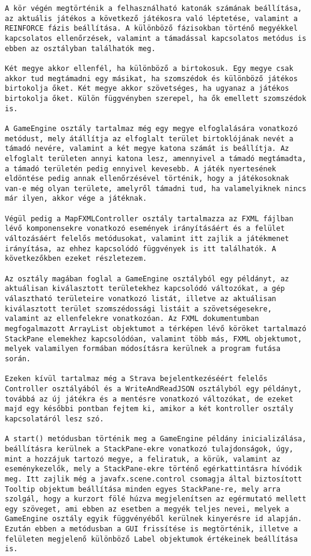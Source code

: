 \begin{verbatim}
A kör végén megtörténik a felhasználható katonák számának beállítása, az aktuális játékos a következő játékosra való léptetése, valamint a REINFORCE fázis beállítása. A különböző fázisokban történő megyékkel kapcsolatos ellenőrzések, valamint a támadással kapcsolatos metódus is ebben az osztályban találhatók meg. 

Két megye akkor ellenfél, ha különböző a birtokosuk. Egy megye csak akkor tud megtámadni egy másikat, ha szomszédok és különböző játékos birtokolja őket. Két megye akkor szövetséges, ha ugyanaz a játékos birtokolja őket. Külön függvényben szerepel, ha ők emellett szomszédok is. 

A GameEngine osztály tartalmaz még egy megye elfoglalására vonatkozó metódust, mely átállítja az elfoglalt terület birtoklójának nevét a támadó nevére, valamint a két megye katona számát is beállítja. Az elfoglalt területen annyi katona lesz, amennyivel a támadó megtámadta, a támadó területén pedig ennyivel kevesebb. A játék nyertesének eldöntése pedig annak ellenőrzésével történik, hogy a játékosoknak van-e még olyan területe, amelyről támadni tud, ha valamelyiknek nincs már ilyen, akkor vége a játéknak. 

Végül pedig a MapFXMLController osztály tartalmazza az FXML fájlban lévő komponensekre vonatkozó események irányításáért és a felület változásáért felelős metódusokat, valamint itt zajlik a játékmenet irányítása, az ehhez kapcsolódó függvények is itt találhatók. A következőkben ezeket részletezem. 

Az osztály magában foglal a GameEngine osztályból egy példányt, az aktuálisan kiválasztott területekhez kapcsolódó változókat, a gép választható területeire vonatkozó listát, illetve az aktuálisan kiválasztott terület szomszédossági listáit a szövetségesekre, valamint az ellenfelekre vonatkozóan. Az FXML dokumentumban megfogalmazott ArrayList objektumot a térképen lévő köröket tartalmazó StackPane elemekhez kapcsolódóan, valamint több más, FXML objektumot, melyek valamilyen formában módosításra kerülnek a program futása során. 

Ezeken kívül tartalmaz még a Strava bejelentkezéséért felelős Controller osztályából és a WriteAndReadJSON osztályból egy példányt, továbbá az új játékra és a mentésre vonatkozó változókat, de ezeket majd egy későbbi pontban fejtem ki, amikor a két kontroller osztály kapcsolatáról lesz szó. 

A start() metódusban történik meg a GameEngine példány inicializálása, beállításra kerülnek a StackPane-ekre vonatkozó tulajdonságok, úgy, mint a hozzájuk tartozó megye, a feliratuk, a körük, valamint az eseménykezelők, mely a StackPane-ekre történő egérkattintásra hívódik meg. Itt zajlik még a javafx.scene.control csomagja által biztosított Tooltip objektum beállítása minden egyes StackPane-re, mely arra szolgál, hogy a kurzort fölé húzva megjelenítsen az egérmutató mellett egy szöveget, ami ebben az esetben a megyék teljes nevei, melyek a GameEngine osztály egyik függvényéből kerülnek kinyerésre id alapján. Ezután ebben a metódusban a GUI frissítése is megtörténik, illetve a felületen megjelenő különböző Label objektumok értékeinek beállítása is. 


\end{verbatim}
